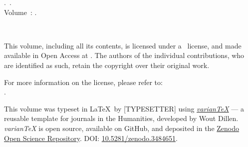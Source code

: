 \null\vfill\small
\noindent\thejournal.~\thejournalsubtitle. \\ 
\noindent Volume~\thevolume: \thevolumetitle. \\ \par
\noindent\doclicenseIcon \ \theyear \\ \par 
\noindent This volume, including all its contents, is licensed under a \doclicenseLongNameRef \ license, and made available in Open Access at \href{\thewebsite}{\thewebsite}. The authors of the individual contributions, who are identified as such, retain the copyright over their original work.  \\ \par
\noindent For more information on the \doclicenseNameRef license, please refer to: \\ \doclicenseURL.  \\ \par

\noindent This volume was typeset in \LaTeX~by [TYPESETTER] using \emph{\href{https://variantex.woutdillen.be}{varianTeX}} --- a reusable template for journals in the Humanities, developed by Wout Dillen. \emph{varianTeX} is open source, available on GitHub, and deposited in the \href{https://about.zenodo.org}{Zenodo Open Science Repository}. DOI: \href{https://zenodo.org/record/3484651#.X0PdDy2w3kI}{10.5281/zenodo.3484651}.  
\newpage